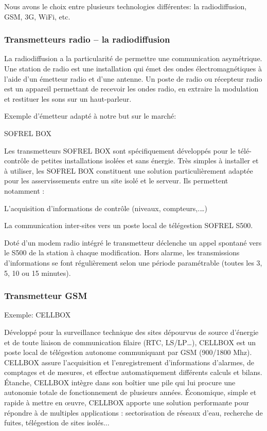 Nous avons le choix entre plusieurs technologies différentes: la radiodiffusion, GSM, 3G, WiFi, etc.

\subsubsection{Transmetteurs radio – la radiodiffusion}

La radiodiffusion a la particularité de permettre une communication asymétrique. 
Une station de radio est une installation qui émet des ondes électromagnétiques à l'aide d'un émetteur radio et d'une antenne. 
Un poste de radio ou récepteur radio est un appareil permettant de recevoir les ondes radio, en extraire la modulation et restituer les sons sur un haut-parleur. 

Exemple d'émetteur adapté à notre but sur le marché: 

SOFREL BOX

\begin{figure}
\begin{center}


\end{center}
\end{figure}

Les transmetteurs SOFREL BOX sont spécifiquement développés pour le télé-contrôle de petites installations isolées et sans énergie.
Très simples à installer et à utiliser, les SOFREL BOX constituent une solution particulièrement adaptée pour les asservissements entre un site isolé et le serveur.
Ils permettent notamment :
\begin{description}
\item L’acquisition d’informations de contrôle (niveaux, compteurs,.…)
\item La communication inter-sites vers un poste local de télégestion SOFREL S500.
\end{description}
Doté d’un modem radio intégré le transmetteur déclenche un appel spontané vers le S500 de la station à chaque modification.
Hors alarme, les transmissions d’informations se font régulièrement selon une période paramétrable (toutes les 3, 5, 10 ou 15 minutes).

\subsubsection{Transmetteur GSM}

Exemple: CELLBOX

Développé pour la surveillance technique des sites dépourvus de source d’énergie et de toute liaison de communication filaire (RTC, LS/LP…), CELLBOX est un poste local de télégestion autonome communiquant par GSM (900/1800 Mhz).
CELLBOX assure l’acquisition et l’enregistrement d’informations d’alarmes, de comptages et de mesures, et effectue automatiquement différents calculs et bilans.
Étanche, CELLBOX intègre dans son boîtier une pile qui lui procure une autonomie totale de fonctionnement de plusieurs années.
Économique, simple et rapide à mettre en œuvre, CELLBOX apporte une solution performante pour répondre à de multiples applications : sectorisation de réseaux d’eau, recherche de fuites, télégestion de sites isolés...


